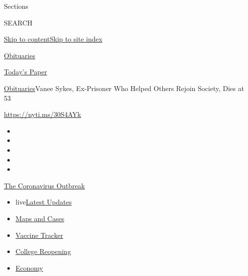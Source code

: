 Sections

SEARCH

\protect\hyperlink{site-content}{Skip to
content}\protect\hyperlink{site-index}{Skip to site index}

\href{https://www.nytimes.com/section/obituaries}{Obituaries}

\href{https://myaccount.nytimes.com/auth/login?response_type=cookie\&client_id=vi}{}

\href{https://www.nytimes.com/section/todayspaper}{Today's Paper}

\href{/section/obituaries}{Obituaries}\textbar{}Vanee Sykes, Ex-Prisoner
Who Helped Others Rejoin Society, Dies at 53

\url{https://nyti.ms/30S4AYk}

\begin{itemize}
\item
\item
\item
\item
\item
\end{itemize}

\href{https://www.nytimes.com/news-event/coronavirus?action=click\&pgtype=Article\&state=default\&region=TOP_BANNER\&context=storylines_menu}{The
Coronavirus Outbreak}

\begin{itemize}
\tightlist
\item
  live\href{https://www.nytimes.com/2020/08/03/world/coronavirus-covid-19.html?action=click\&pgtype=Article\&state=default\&region=TOP_BANNER\&context=storylines_menu}{Latest
  Updates}
\item
  \href{https://www.nytimes.com/interactive/2020/us/coronavirus-us-cases.html?action=click\&pgtype=Article\&state=default\&region=TOP_BANNER\&context=storylines_menu}{Maps
  and Cases}
\item
  \href{https://www.nytimes.com/interactive/2020/science/coronavirus-vaccine-tracker.html?action=click\&pgtype=Article\&state=default\&region=TOP_BANNER\&context=storylines_menu}{Vaccine
  Tracker}
\item
  \href{https://www.nytimes.com/2020/08/02/us/covid-college-reopening.html?action=click\&pgtype=Article\&state=default\&region=TOP_BANNER\&context=storylines_menu}{College
  Reopening}
\item
  \href{https://www.nytimes.com/live/2020/08/03/business/stock-market-today-coronavirus?action=click\&pgtype=Article\&state=default\&region=TOP_BANNER\&context=storylines_menu}{Economy}
\end{itemize}

